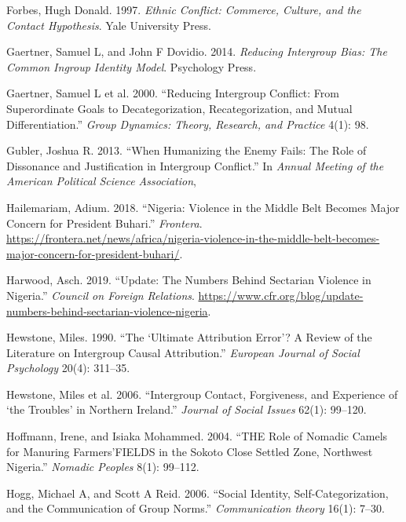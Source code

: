 \documentclass[11pt]{article}
\begin{document}
\leavevmode\hypertarget{ref-forbes1997ethnic}{}%
Forbes, Hugh Donald. 1997. \emph{Ethnic Conflict: Commerce, Culture, and
the Contact Hypothesis}. Yale University Press.

\leavevmode\hypertarget{ref-gaertner2014reducing}{}%
Gaertner, Samuel L, and John F Dovidio. 2014. \emph{Reducing Intergroup
Bias: The Common Ingroup Identity Model}. Psychology Press.

\leavevmode\hypertarget{ref-gaertner2000reducing}{}%
Gaertner, Samuel L et al. 2000. ``Reducing Intergroup Conflict: From
Superordinate Goals to Decategorization, Recategorization, and Mutual
Differentiation.'' \emph{Group Dynamics: Theory, Research, and Practice}
4(1): 98.

\leavevmode\hypertarget{ref-gubler2013humanizing}{}%
Gubler, Joshua R. 2013. ``When Humanizing the Enemy Fails: The Role of
Dissonance and Justification in Intergroup Conflict.'' In \emph{Annual
Meeting of the American Political Science Association},

\leavevmode\hypertarget{ref-frontera2018nigeria}{}%
Hailemariam, Adium. 2018. ``Nigeria: Violence in the Middle Belt Becomes
Major Concern for President Buhari.'' \emph{Frontera}.
\url{https://frontera.net/news/africa/nigeria-violence-in-the-middle-belt-becomes-major-concern-for-president-buhari/}.

\leavevmode\hypertarget{ref-council2019nigeria}{}%
Harwood, Asch. 2019. ``Update: The Numbers Behind Sectarian Violence in
Nigeria.'' \emph{Council on Foreign Relations}.
\url{https://www.cfr.org/blog/update-numbers-behind-sectarian-violence-nigeria}.

\leavevmode\hypertarget{ref-hewstone1990ultimate}{}%
Hewstone, Miles. 1990. ``The `Ultimate Attribution Error'? A Review of
the Literature on Intergroup Causal Attribution.'' \emph{European
Journal of Social Psychology} 20(4): 311--35.

\leavevmode\hypertarget{ref-hewstone2006intergroup}{}%
Hewstone, Miles et al. 2006. ``Intergroup Contact, Forgiveness, and
Experience of `the Troubles' in Northern Ireland.'' \emph{Journal of
Social Issues} 62(1): 99--120.

\leavevmode\hypertarget{ref-hoffmann2004role}{}%
Hoffmann, Irene, and Isiaka Mohammed. 2004. ``THE Role of Nomadic Camels
for Manuring Farmers'FIELDS in the Sokoto Close Settled Zone, Northwest
Nigeria.'' \emph{Nomadic Peoples} 8(1): 99--112.

\leavevmode\hypertarget{ref-hogg2006social}{}%
Hogg, Michael A, and Scott A Reid. 2006. ``Social Identity,
Self-Categorization, and the Communication of Group Norms.''
\emph{Communication theory} 16(1): 7--30.
\end{document}
